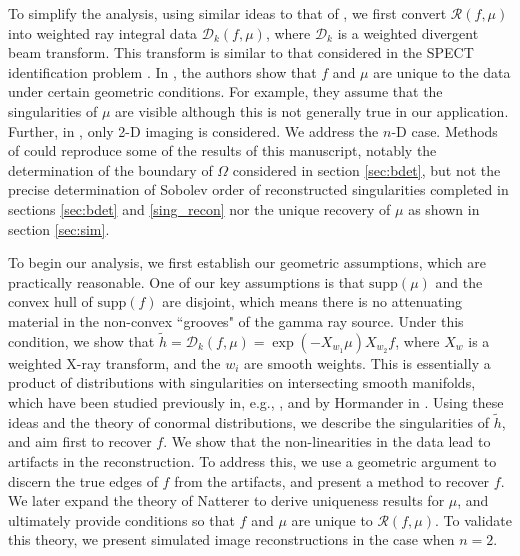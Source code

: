 \documentclass[a4paper,12pt]{amsart}
\numberwithin{equation}{section}
\theoremstyle{plain}
\numberwithin{theorem}{section}
\theoremstyle{definition}
\theoremstyle{remark}
\theoremstyle{remark}
\theoremstyle{remark}
\begin{document}
To simplify the analysis, using similar ideas to that of \cite{kuchment2017inversion,terzioglu2020exact}, we first convert $\mathcal{R}(f,\mu)$ into weighted ray integral data $\mathcal{D}_k(f,\mu)$, where $\mathcal{D}_k$ is a weighted divergent beam transform. This transform is similar to that considered in the SPECT identification problem \cite{holman2020spect,SeanHolman,natterer1981identification,solmon1995identification,stefanov2014identification}. In \cite{SeanHolman}, the authors show that $f$ and $\mu$ are unique to the data under certain geometric conditions. For example, they assume that the singularities of $\mu$ are visible although this is not generally true in our application. Further, in \cite{SeanHolman}, only 2-D imaging is considered. We address the $n$-D case. Methods of \cite{SeanHolman} could reproduce some of the results of this manuscript, notably the determination of the boundary of $\Omega$ considered in section \ref{sec:bdet}, but not the precise determination of Sobolev order of reconstructed singularities completed in sections \ref{sec:bdet} and \ref{sing_recon} nor the unique recovery of $\mu$ as shown in section \ref{sec:sim}.

To begin our analysis, we first establish our geometric assumptions, which are practically reasonable.  One of our key assumptions is that $\text{supp}(\mu)$ and the convex hull of $\text{supp}(f)$ are disjoint, which means there is no attenuating material in the non-convex ``grooves" of the gamma ray source. Under this condition, we show that $\tilde{h} = \mathcal{D}_k(f,\mu) = \exp(-X_{w_1}\mu)X_{w_2}f$, where $X_w$ is a weighted X-ray transform, and the $w_i$ are smooth weights. This is essentially a product of distributions with singularities on intersecting smooth manifolds, which have been studied previously in, e.g., \cite{palacios2018quantitative}, and by Hormander in \cite[Theorem 8.2.10]{hormanderI}. Using these ideas and the theory of conormal distributions, we describe the singularities of $\tilde{h}$, and aim first to recover $f$. We show that the non-linearities in the data lead to artifacts in the reconstruction. To address this, we use a geometric argument to discern the true edges of $f$ from the artifacts, and present a method to recover $f$. We later expand the theory of Natterer \cite[Theorem 3.3]{natterer} to derive uniqueness results for $\mu$, and ultimately provide conditions so that $f$ and $\mu$ are unique to $\mathcal{R}(f,\mu)$. To validate this theory, we present simulated image reconstructions in the case when $n = 2$.
\end{document}
